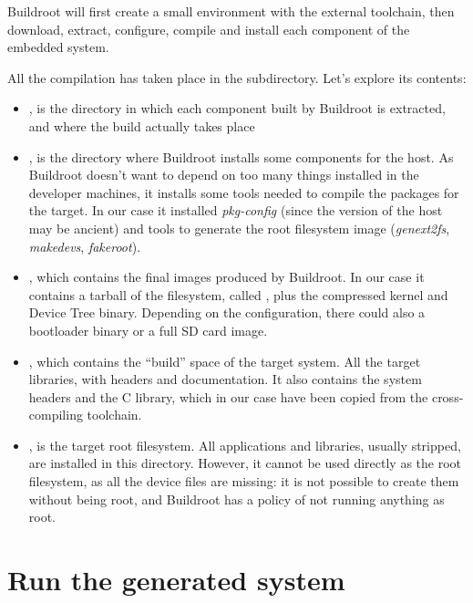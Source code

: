 
Buildroot will first create a small environment with the external
toolchain, then download, extract, configure, compile and install each
component of the embedded system.

All the compilation has taken place in the  subdirectory. Let's
explore its contents:

\begin{itemize}

\item {}, is the directory in which each component built by
  Buildroot is extracted, and where the build actually takes place

\item {}, is the directory where Buildroot installs some
  components for the host. As Buildroot doesn't want to depend on too
  many things installed in the developer machines, it installs some
  tools needed to compile the packages for the target. In our case it
  installed {\em pkg-config} (since the version of the host may be ancient)
  and tools to generate the root filesystem image ({\em genext2fs},
  {\em makedevs}, {\em fakeroot}).

\item {}, which contains the final images produced by
  Buildroot. In our case it contains a tarball of the filesystem, called
  , plus the compressed kernel and Device Tree binary.
  Depending on the configuration, there could also a bootloader binary
  or a full SD card image.

\item {}, which contains the “build” space of the target
  system. All the target libraries, with headers and documentation. It
  also contains the system headers and the C library, which in our
  case have been copied from the cross-compiling toolchain.

\item {}, is the target root filesystem. All applications
  and libraries, usually stripped, are installed in this
  directory. However, it cannot be used directly as the root
  filesystem, as all the device files are missing: it is not possible
  to create them without being root, and Buildroot has a policy of not
  running anything as root.

\end{itemize}

\section{Run the generated system}

